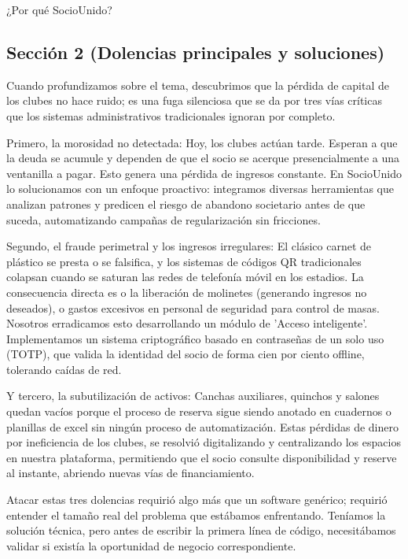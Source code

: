 ¿Por qué SocioUnido?

\newpage

\subsection{Sección 2 (Dolencias principales y soluciones)}

Cuando profundizamos sobre el tema, descubrimos que la pérdida de capital de los clubes no hace ruido; es una fuga silenciosa que se da por tres vías críticas que los sistemas administrativos tradicionales ignoran por completo.

Primero, la morosidad no detectada:
Hoy, los clubes actúan tarde. Esperan a que la deuda se acumule y dependen de que el socio se acerque presencialmente a una ventanilla a pagar. Esto genera una pérdida de ingresos constante. En SocioUnido lo solucionamos con un enfoque proactivo: integramos diversas herramientas que analizan patrones y predicen el riesgo de abandono societario antes de que suceda, automatizando campañas de regularización sin fricciones.

Segundo, el fraude perimetral y los ingresos irregulares:
El clásico carnet de plástico se presta o se falsifica, y los sistemas de códigos QR tradicionales colapsan cuando se saturan las redes de telefonía móvil en los estadios. La consecuencia directa es o la liberación de molinetes (generando ingresos no deseados), o gastos excesivos en personal de seguridad para control de masas. Nosotros erradicamos esto desarrollando un módulo de 'Acceso inteligente'. Implementamos un sistema criptográfico basado en contraseñas de un solo uso (TOTP), que valida la identidad del socio de forma cien por ciento offline, tolerando caídas de red.

Y tercero, la subutilización de activos:
Canchas auxiliares, quinchos y salones quedan vacíos porque el proceso de reserva sigue siendo anotado en cuadernos o planillas de excel sin ningún proceso de automatización.
Estas pérdidas de dinero por ineficiencia de los clubes, se resolvió digitalizando y centralizando los espacios en nuestra plataforma, permitiendo que el socio consulte disponibilidad y reserve al instante, abriendo nuevas vías de financiamiento.

Atacar estas tres dolencias requirió algo más que un software genérico; requirió entender el tamaño real del problema que estábamos enfrentando.
Teníamos la solución técnica, pero antes de escribir la primera línea de código, necesitábamos validar si existía la oportunidad de negocio correspondiente.

